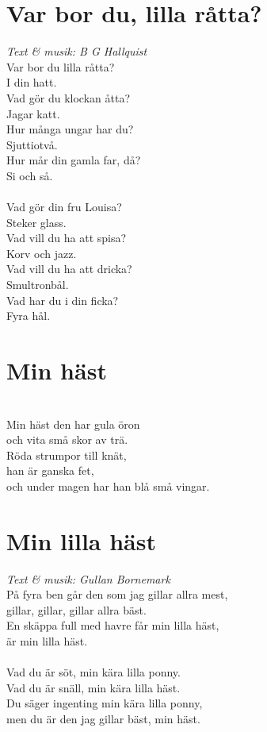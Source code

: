 \section{Var bor du, lilla råtta?}
\textit{Text & musik: B G Hallquist}
\vspace{2mm}\\
Var bor du lilla råtta?\\
I din hatt.\\
Vad gör du klockan åtta?\\
Jagar katt.\\
Hur många ungar har du?\\
Sjuttiotvå.\\
Hur mår din gamla far, då?\\
Si och så.\\
\\
Vad gör din fru Louisa?\\
Steker glass.\\
Vad vill du ha att spisa?\\
Korv och jazz.\\
Vad vill du ha att dricka?\\
Smultronbål.\\
Vad har du i din ficka?\\
Fyra hål.\\

\section{Min häst}
\vspace{2mm}\\
Min häst den har gula öron\\
och vita små skor av trä.\\
Röda strumpor till knät,\\
han är ganska fet,\\
och under magen har han blå små vingar.\\

\section{Min lilla häst}
\textit{Text & musik: Gullan Bornemark}
\vspace{2mm}\\
På fyra ben går den som jag gillar allra mest,\\
gillar, gillar, gillar allra bäst.\\
En skäppa full med havre får min lilla häst,\\
är min lilla häst.\\
\\
Vad du är söt, min kära lilla ponny.\\
Vad du är snäll, min kära lilla häst.\\
Du säger ingenting min kära lilla ponny,\\
men du är den jag gillar bäst, min häst.\\

